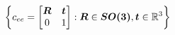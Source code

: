 \begin{equation}\label{eq:se3}
  \biggr\{
  c_{ee}=
  \begin{bmatrix}
  \vb*{R} & \vb*{t} \\
   0      &  1  
  \end{bmatrix}
  :
  \vb*{R} \in \vb*{SO(3)},
  \vb*{t} \in \mathbb{R}^3
\biggl\}
\end{equation}

